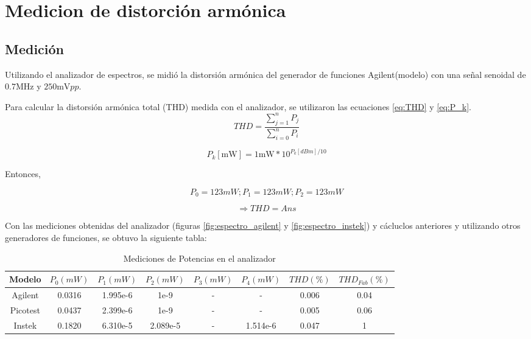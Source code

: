 \chapter{Medicion de distorción armónica}
\section{Medición}
Utilizando el analizador de espectros, se midió la distorsión armónica del generador de funciones Agilent(modelo)
con una señal senoidal de $0.7\si{\mega\hertz}$ y $250\si{\milli\volt} pp$.

Para calcular la distorsión armónica total (THD) medida con el analizador, se utilizaron las ecuaciones \ref{eq:THD}
y \ref{eq:P_k}.
\begin{equation}
    THD=\frac{\sum_{j=1}^{n} P_j}{\sum_{i=0}^{n} P_i}
    \label{eq:THD}
\end{equation}

\begin{equation}
    P_k[\si{\milli\watt}]= 1\si{\milli\watt} * 10^{P_k[dBm]/10}
    \label{eq:P_k}
\end{equation}

Entonces,

\begin{equation*}
    P_0 = 123 mW;P_1 = 123 mW;P_2 = 123 mW
\end{equation*}

\begin{equation}
    \Rightarrow THD = Ans
\end{equation}

Con las mediciones obtenidas del analizador (figuras \ref{fig:espectro_agilent} y \ref{fig:espectro_instek}) y cácluclos anteriores y utilizando otros generadores de funciones, se obtuvo la siguiente tabla:

\begin{table}[h]
    \begin{center}
        \begin{tabular}{|c|c|c|c|c|c|c|c|}
            \hline
            Modelo & $P_0 (mW)$ & $P_1 (mW)$ & $P_2(mW)$ & $P_3(mW)$ & $P_4(mW)$ & $THD(\%)$ & $THD_{Fab}(\%)$ \\
            \hline
            Agilent  & 0.0316 & 1.995e-6 & 1e-9 & - & - & 0.006 & 0.04 \\
            Picotest & 0.0437 & 2.399e-6 & 1e-9 & - & - & 0.005 & 0.06 \\
            Instek   & 0.1820 & 6.310e-5 & 2.089e-5 & - & 1.514e-6 & 0.047 & 1 \\
            \hline
        \end{tabular}
        \caption{Mediciones de Potencias en el analizador}
        \label{tab:ejmeas}
    \end{center}
\end{table}

